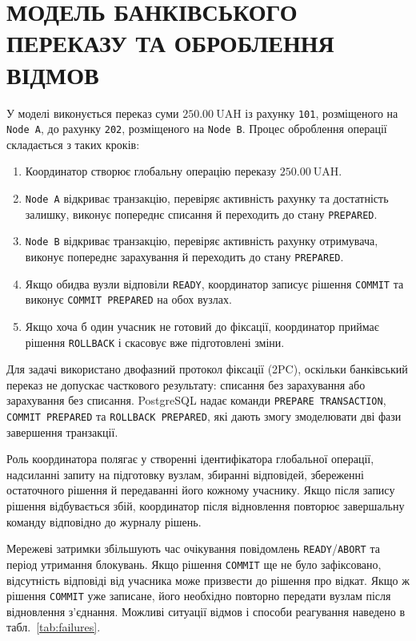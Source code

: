 \clearpage
\section{МОДЕЛЬ БАНКІВСЬКОГО ПЕРЕКАЗУ ТА ОБРОБЛЕННЯ ВІДМОВ}

У моделі виконується переказ суми \(250.00~\mathrm{UAH}\) із рахунку \texttt{101}, розміщеного на \texttt{Node A}, до рахунку \texttt{202}, розміщеного на \texttt{Node B}. Процес оброблення операції складається з таких кроків:
\begin{enumerate}
    \item Координатор створює глобальну операцію переказу \(250.00~\mathrm{UAH}\).
    \item \texttt{Node A} відкриває транзакцію, перевіряє активність рахунку та достатність залишку, виконує попереднє списання й переходить до стану \texttt{PREPARED}.
    \item \texttt{Node B} відкриває транзакцію, перевіряє активність рахунку отримувача, виконує попереднє зарахування й переходить до стану \texttt{PREPARED}.
    \item Якщо обидва вузли відповіли \texttt{READY}, координатор записує рішення \texttt{COMMIT} та виконує \texttt{COMMIT PREPARED} на обох вузлах.
    \item Якщо хоча б один учасник не готовий до фіксації, координатор приймає рішення \texttt{ROLLBACK} і скасовує вже підготовлені зміни.
\end{enumerate}

Для задачі використано двофазний протокол фіксації (2PC), оскільки банківський переказ не допускає часткового результату: списання без зарахування або зарахування без списання. PostgreSQL надає команди \texttt{PREPARE TRANSACTION}, \texttt{COMMIT PREPARED} та \texttt{ROLLBACK PREPARED}, які дають змогу змоделювати дві фази завершення транзакції.

Роль координатора полягає у створенні ідентифікатора глобальної операції, надсиланні запиту на підготовку вузлам, збиранні відповідей, збереженні остаточного рішення й передаванні його кожному учаснику. Якщо після запису рішення відбувається збій, координатор після відновлення повторює завершальну команду відповідно до журналу рішень.

Мережеві затримки збільшують час очікування повідомлень \texttt{READY}/\texttt{ABORT} та період утримання блокувань. Якщо рішення \texttt{COMMIT} ще не було зафіксовано, відсутність відповіді від учасника може призвести до рішення про відкат. Якщо ж рішення \texttt{COMMIT} уже записане, його необхідно повторно передати вузлам після відновлення з'єднання. Можливі ситуації відмов і способи реагування наведено в табл.~\ref{tab:failures}.

